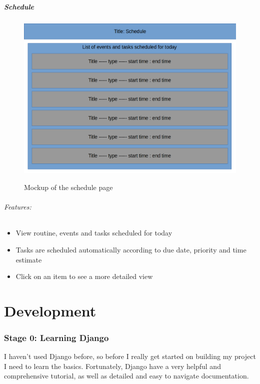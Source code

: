\documentclass{article}
\begin{document}
\subsubsection{Schedule}
\begin{minipage}{0.5\textwidth}
\begin{figure}[H]
\includegraphics[width=\linewidth]{Mockups/schedule.png}
\label{fig:schedule_mockup}
\caption{Mockup of the schedule page}
\end{figure}
\end{minipage} \hfill
\begin{minipage}{0.45\textwidth}
\paragraph{Features:}
\begin{itemize}
\item View routine, events and tasks scheduled for today
\item Tasks are scheduled automatically according to due date, priority and time estimate
\item Click on an item to see a more detailed view
\end{itemize}
\end{minipage}

\part{Development}
\section{Stage 0: Learning Django}
I haven't used Django before,
so before I really get started on building my project I need to learn the basics.
Fortunately, Django have a very helpful and comprehensive tutorial,
as well as detailed and easy to navigate documentation.
\end{document}
